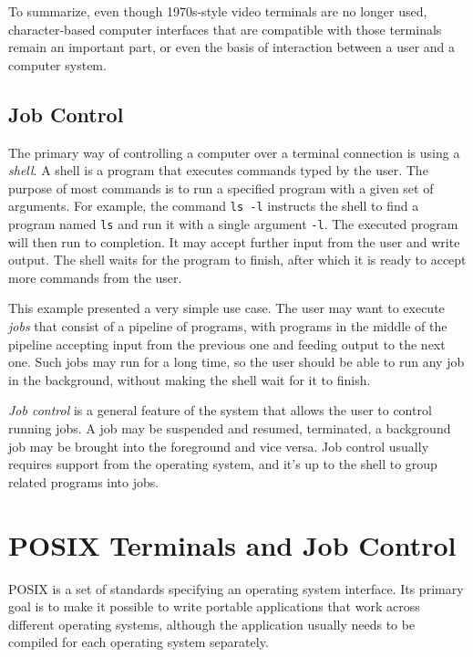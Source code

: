\documentclass[shortabstract, manyadvisors, english, mgr]{iithesis}
\begin{document}
To summarize, even though 1970s-style video terminals are no longer used,
character-based computer interfaces that are compatible with those terminals
remain an important part, or even the basis of interaction between a user and a
computer system.

\section{Job Control}

The primary way of controlling a computer over a terminal connection is using a
\textit{shell}. A shell is a program that executes commands typed by the user.
The purpose of most commands is to run a specified program with a given set of
arguments. For example, the command \texttt{ls -l} instructs the shell to find a
program named \texttt{ls} and run it with a single argument \texttt{-l}.
The executed program will then run to completion. It may accept further input
from the user and write output. The shell waits for the program to finish, after
which it is ready to accept more commands from the user.

This example presented a very simple use case.
The user may want to execute \textit{jobs} that consist of a pipeline of
programs, with programs in the middle of the pipeline accepting input from the
previous one and feeding output to the next one. Such jobs may run for a long
time, so the user should be able to run any job in the background, without
making the shell wait for it to finish.

\textit{Job control} is a general feature of the system that allows the user to
control running jobs. A job may be suspended and resumed, terminated, a
background job may be brought into the foreground and vice versa. Job control
usually requires support from the operating system, and it's up to the shell to
group related programs into jobs.

\chapter{POSIX Terminals and Job Control}
POSIX\cite{posix} is a set of standards specifying an operating system
interface. Its primary goal is to make it possible to write portable
applications that work across different operating systems, although the
application usually needs to be compiled for each operating system separately.
\end{document}
